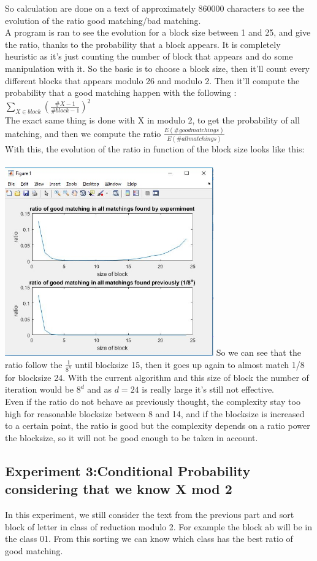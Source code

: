 \documentclass{article}
\begin{document}
So calculation are done on a text of approximately $860000$ characters to see the evolution of the ratio good matching/bad matching.\\
A program is ran to see the evolution for a block size between 1 and 25, and give the ratio, thanks to the probability that a block appears. It is completely heuristic as it's just counting the number of block that appears and do some manipulation with it.
So the basic is to choose a block size, then it'll count every different blocks that appears modulo 26 and modulo 2.
Then it'll compute the probability that a good matching happen with the following : $\sum_{X \in block}({\frac{\#X -1}{\#block -1}})^2 $\\
The exact same thing is done with X in modulo 2, to get the probability of all matching, and then we compute the ratio $\frac{E(\# good matchings)}{E(\# all matchings)}$\\
With this, the evolution of the ratio in function of the block size looks like this:\\
\\
\includegraphics[width=90mm]{ratio.jpg}
So we can see that the ratio follow the $\frac{1}{8^n}$ until blocksize 15, then it goes up again to almost match 1/8 for blocksize 24. With the current algorithm and this size of block the number of iteration would be $8^d$ and as $d = 24$ is really large it's still not effective.\\
Even if the ratio do not behave as previously thought, the complexity stay too high for reasonable blocksize between 8 and 14, and if the blocksize is increased to a certain point, the ratio is good but the complexity depends on a ratio power the blocksize, so it will not be good enough to be taken in account.

\subsection*{Experiment 3:Conditional Probability considering that we know X mod 2}
In this experiment, we still consider the text from the previous part and sort block of letter in class of reduction modulo 2.
For example the block ab will be in the class 01. From this sorting we can know which class has the best ratio of good matching.
\end{document}
